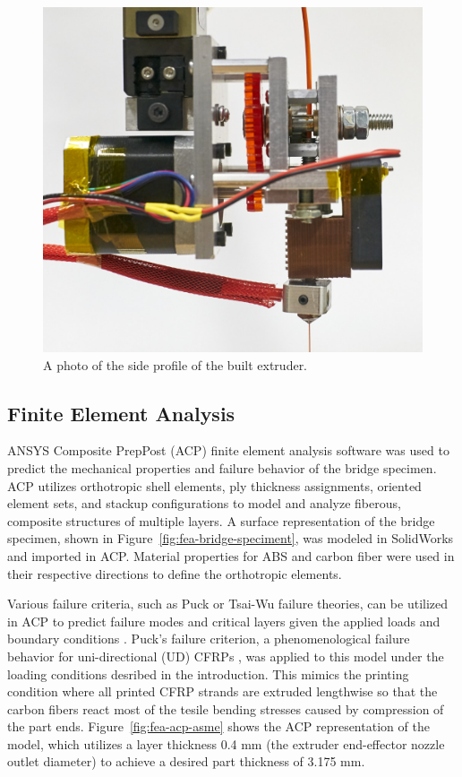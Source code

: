\begin{figure}[htp]
\centering
\includegraphics[width=0.8\linewidth]{./figures/extruder-side-profile}
\caption{A photo of the side profile of the built extruder.}
\label{fig:extruder-side-profile}
\end{figure}


\subsection*{Finite Element Analysis}

ANSYS Composite PrepPost (ACP) finite element analysis software was used to predict the mechanical properties and failure behavior of the bridge specimen. ACP utilizes orthotropic shell elements, ply thickness assignments, oriented element sets, and stackup configurations to model and analyze fiberous, composite structures of multiple layers. A surface representation of the bridge specimen, shown in Figure~\ref{fig:fea-bridge-speciment}, was modeled in SolidWorks and imported in ACP. Material properties for ABS and carbon fiber were used in their respective directions to define the orthotropic elements.

Various failure criteria, such as Puck or Tsai-Wu failure theories, can be utilized in ACP to predict failure modes and critical layers given the applied loads and boundary conditions \cite{ACP-manual}. Puck's failure criterion, a phenomenological failure behavior for uni-directional (UD) CFRPs \cite{Puck-Stuttgard,Puck-NASA}, was applied to this model under the loading conditions desribed in the introduction. This mimics the printing condition where all printed CFRP strands are extruded lengthwise so that the carbon fibers react most of the tesile bending stresses caused by compression of the part ends. Figure~\ref{fig:fea-acp-asme} shows the ACP representation of the model, which utilizes a layer thickness 0.4 mm (the extruder end-effector nozzle outlet diameter) to achieve a desired part thickness of 3.175 mm.

